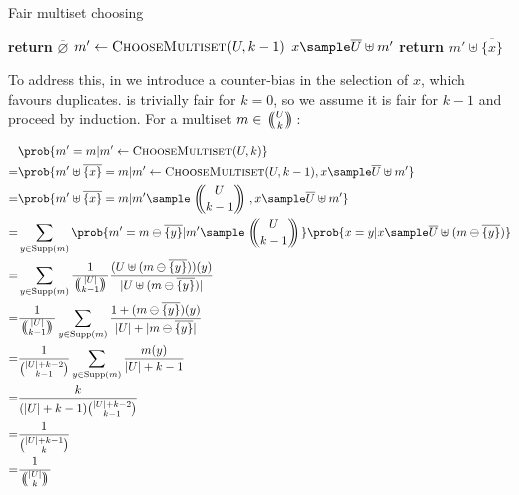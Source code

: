 \documentclass[letterpaper,luatex,11pt]{article}
\newcommand{\multichoose}[2]{
\left.\mathchoice
  {\left(\kern-0.48em\binom{#1}{#2}\kern-0.48em\right)}
  {\big(\kern-0.30em\binom{\smash{#1}}{\smash{#2}}\kern-0.30em\big)}
  {\left(\kern-0.30em\binom{\smash{#1}}{\smash{#2}}\kern-0.30em\right)}
  {\left(\kern-0.30em\binom{\smash{#1}}{\smash{#2}}\kern-0.30em\right)}
\right.}
\DeclareMathOperator{\Supp}{Supp}
\begin{document}


\begin{algorithm}
\caption{Fair multiset choosing}
\begin{algorithmic}[0]
        \State \textbf{return} $\overline{\varnothing}$
    \Else
        \State $m' \leftarrow \textproc{ChooseMultiset}(U, k-1)$
        \State $x \sample \overline{U} \uplus m'$
        \State \textbf{return} $m' \uplus \overline{\{x\}}$
    \EndIf
\EndProcedure
\end{algorithmic}
\end{algorithm}

To address this, in 
we introduce a counter-bias in the selection of $x$, which favours duplicates.
 is trivially fair for $k = 0$, so
we assume it is fair for $k - 1$ and proceed by induction.
For a multiset $m \in \multichoose{U}{k}$:

\begin{align*}
    &\prob{m' = m | m' \leftarrow \textproc{ChooseMultiset}(U, k)}
    \\
    =&
    \prob{m' \uplus \overline{\{x\}} = m
        | m' \leftarrow \textproc{ChooseMultiset}(U, k-1), x \sample \overline{U} \uplus m'}
    \\
    =&
    \prob{m' \uplus \overline{\{x\}} = m
        | m' \sample \multichoose{U}{k - 1}, x \sample \overline{U} \uplus m'}
    \\
    =&
    \sum_{y \in \Supp(m)}
    \prob{m' = m \ominus \overline{\{y\}} | m' \sample \multichoose{U}{k - 1}}
    \prob{x = y | x \sample \overline{U} \uplus (m \ominus \overline{\{y\}})}
    \\
    =&
    \sum_{y \in \Supp(m)}
    \frac{1}{\multichoose{|U|}{k - 1}}
    \frac{(U \uplus (m \ominus \overline{\{y\}}))(y)}{|U \uplus (m \ominus \overline{\{y\}})|}
    \\
    =&
    \frac{1}{\multichoose{|U|}{k - 1}}
    \sum_{y \in \Supp(m)}
    \frac{1 + (m \ominus \overline{\{y\}})(y)}{|U| + |m \ominus \overline{\{y\}}|}
    \\
    =&
    \frac{1}{\binom{|U| + k - 2}{k-1}}
    \sum_{y \in \Supp(m)}
    \frac{m(y)}{|U| + k -1}
    \\
    =& \frac{k}{(|U| + k -1)\binom{|U| + k - 2}{k-1}}
    \\
    =& \frac{1}{\binom{|U| + k - 1}{k}}
    \\
    =& \frac{1}{\multichoose{|U|}{k}}
\end{align*}
\end{document}
